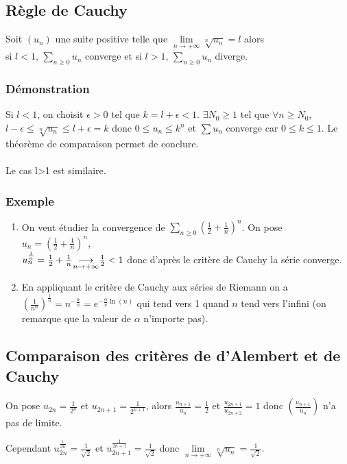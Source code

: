 \documentclass[a4paper,10pt]{book} %
\newcommand{\lime}[4]{#1\underset{\mathclap{#2 \rightarrow #3}}{\longrightarrow} #4}
\begin{document}
\subsection{Règle de Cauchy}
Soit $(u_n)$ une suite positive telle que $\lim\limits_{n\rightarrow+\infty}\sqrt[n]{u_n}=l$ alors\\si $l<1$, $\sum_{n\geq 0} u_n$ converge et si $l>1$, $\sum_{n\geq 0} u_n$ diverge.

\subsubsection{Démonstration}
Si $l<1$, on choisit $\epsilon>0$ tel que $k=l+\epsilon<1$. $\exists N_0\geq 1$ tel que $\forall n\geq N_0$, $l-\epsilon\leq \sqrt[n]{u_n}\leq l+\epsilon=k$ donc $0\leq u_n\leq k^n$ et $\sum u_n$ converge car $0\leq k\leq 1$. Le théorème de comparaison permet de conclure.\\\\
Le cas l>1 est similaire.

\subsubsection{Exemple}
\begin{enumerate}
\item On veut étudier la convergence de $\sum_{n\geq 0}(\frac{1}{2}+\frac{1}{n})^n$. On pose $u_n=(\frac{1}{2}+\frac{1}{n})^n$, \\
$u_n^{\frac{1}{n}}=\lime{\frac{1}{2}+\frac{1}{n}~}{n}{+\infty}{~\frac{1}{2}}<1$ donc d'après le critère de Cauchy la série converge.

\item En appliquant le critère de Cauchy aux séries de Riemann on a $(\frac{1}{n^\alpha})^{\frac{1}{n}}=n^{-\frac{\alpha}{n}}=e^{-\frac{\alpha}{n}\ln(n)}$ qui tend vers 1 quand $n$ tend vers l'infini (on remarque que la valeur de $\alpha$ n'importe pas).
\end{enumerate}

\subsection{Comparaison des critères de d'Alembert et de Cauchy}
On pose $u_{2n}=\frac{1}{2^n}$ et $u_{2n+1}=\frac{1}{2^{n+1}}$, alors 
$\frac{u_{n+1}}{u_n}=\frac{1}{2}$ et $\frac{u_{2n+1}}{u_{2n+2}}=1$ donc $(\frac{u_{n+1}}{u_n})$ n'a pas de limite.

Cependant $u_{2n}^{\frac{1}{2n}}=\frac{1}{\sqrt{2}}$ et $u_{2n+1}^{\frac{1}{2n+1}}=\frac{1}{\sqrt{2}}$ donc $\lim\limits_{n\rightarrow+\infty} \sqrt[n]{u_n}=\frac{1}{\sqrt{2}}$.
\end{document}
